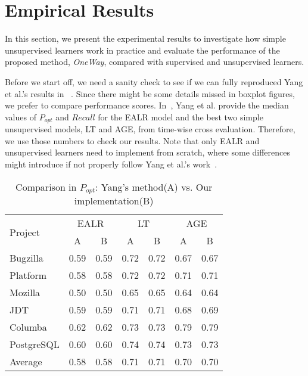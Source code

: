 \section{Empirical Results}
In this section, we present the experimental results to investigate how
simple unsupervised learners work in practice and evaluate the performance
of the proposed method, {\it OneWay}, compared with supervised and unsupervised learners.

Before we start off, we need a sanity check to see if we can fully 
reproduced Yang et al.'s results in ~\cite{yang2016effort}. Since 
there might be some details missed in boxplot figures, we prefer to
compare performance scores. In~\cite{yang2016effort}, Yang et al.
provide the median values of $P_{opt}$ and $Recall$ for the EALR
model and the best two simple unsupervised models, LT and AGE, from
time-wise cross evaluation. Therefore, we use those numbers to check
our results. Note that only EALR and unsupervised learners need to implement from scratch,
where some differences might introduce if not 
properly follow Yang et al.'s work~\cite{yang2016effort}.

\begin{table}[]
    \centering
    \caption{ Comparison in $P_{opt}$: Yang's method(A) vs. Our implementation(B)}
    \begin{tabular}{l|c c| c c| c c}

    \hline
        \multirow{2}{*}{Project} &
        \multicolumn{2}{c|}{EALR} &
        \multicolumn{2}{c|}{LT} &\multicolumn{2}{c}{AGE} \\
        \cline{2-7}
        &A & B& A&B&A&B \\
        \hline
        Bugzilla & 0.59 & 0.59 &0.72 &  0.72& 0.67  & 0.67 \\
        Platform & 0.58 & 0.58 & 0.72 & 0.72 & 0.71 & 0.71\\
        Mozilla & 0.50 &0.50 &0.65 &0.65 &0.64&0.64\\
        JDT & 0.59 & 0.59& 0.71 &0.71 & 0.68  & 0.69\\
        Columba & 0.62 & 0.62& 0.73 & 0.73 & 0.79  & 0.79 \\
        PostgreSQL & 0.60 &0.60&0.74&0.74&0.73 &0.73\\ \hline
        Average & 0.58 & 0.58 & 0.71 & 0.71 & 0.70 &0.70 \\ \hline
    \end{tabular}
    \label{tab:comp_Popt}
\end{table}



